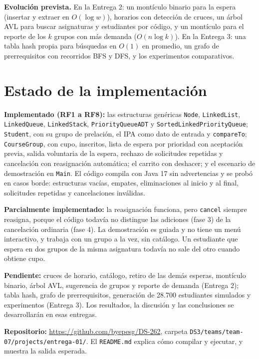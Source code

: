 \documentclass[conference]{IEEEtran}
\begin{document}
\textbf{Evolución prevista.} En la Entrega 2: un montículo binario para la espera (insertar y extraer en $O(\log w)$), horarios con detección de cruces, un árbol AVL para buscar asignaturas y estudiantes por código, y un montículo para el reporte de los $k$ grupos con más demanda ($O(n \log k)$). En la Entrega 3: una tabla hash propia para búsquedas en $O(1)$ en promedio, un grafo de prerrequisitos con recorridos BFS y DFS, y los experimentos comparativos.


\section{Estado de la implementación}

\textbf{Implementado (RF1 a RF8):} las estructuras genéricas \texttt{Node}, \texttt{LinkedList}, \texttt{LinkedQueue}, \texttt{LinkedStack}, \texttt{PriorityQueueADT} y \texttt{SortedLinkedPriorityQueue}; \texttt{Student}, con su grupo de prelación, el IPA como dato de entrada y \texttt{compareTo}; \texttt{CourseGroup}, con cupo, inscritos, lista de espera por prioridad con aceptación previa, salida voluntaria de la espera, rechazo de solicitudes repetidas y cancelación con reasignación automática; el carrito con deshacer; y el escenario de demostración en \texttt{Main}. El código compila con Java 17 sin advertencias y se probó en casos borde: estructuras vacías, empates, eliminaciones al inicio y al final, solicitudes repetidas y cancelaciones inválidas.

\textbf{Parcialmente implementado:} la reasignación funciona, pero \texttt{cancel} siempre reasigna, porque el código todavía no distingue las adiciones (fase 3) de la cancelación ordinaria (fase 4). La demostración es guiada y no tiene un menú interactivo, y trabaja con un grupo a la vez, sin catálogo. Un estudiante que espera en dos grupos de la misma asignatura todavía no sale del otro cuando obtiene cupo.

\textbf{Pendiente:} cruces de horario, catálogo, retiro de las demás esperas, montículo binario, árbol AVL, sugerencia de grupos y reporte de demanda (Entrega 2); tabla hash, grafo de prerrequisitos, generación de 28.700 estudiantes simulados y experimentos (Entrega 3). Los resultados, la discusión y las conclusiones se desarrollarán en esas entregas.

\textbf{Repositorio:} \url{https://github.com/byepesg/DS-262}, carpeta \texttt{DS3/teams/team-07/projects/entrega-01/}. El \texttt{README.md} explica cómo compilar y ejecutar, y muestra la salida esperada.
\end{document}

